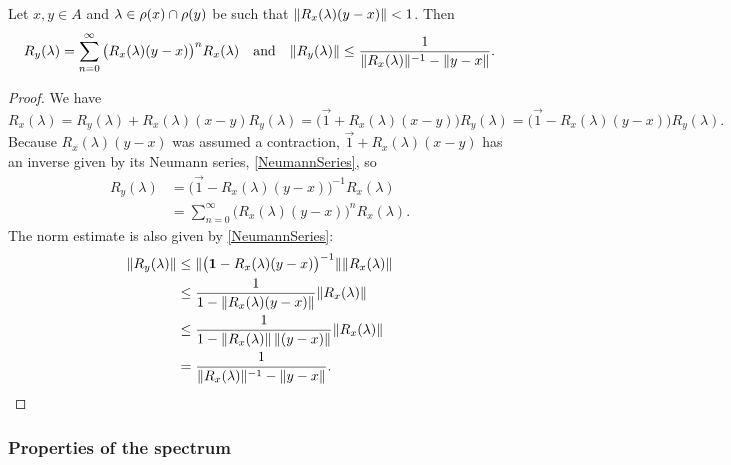 \begin{corollary}
Let $x,y\in A$ and $\lambda\in \rho(x)\cap \rho(y)$ be such that $\lVert R_x(\lambda)(y-x)\rVert<1$. Then 
\[ R_y(\lambda) = \sum_{n=0}^\infty \big(R_x(\lambda)(y-x)\big)^nR_x(\lambda) \quad\text{and}\quad \lVert R_y(\lambda)\rVert \leq \frac{1}{\lVert R_x(\lambda)\rVert^{-1} - \lVert y-x\rVert}. \]
\end{corollary}
\begin{proof}
We have
\[ R_x(\lambda) = R_y(\lambda) + R_x(\lambda)(x-y)R_y(\lambda) = \big(\vec{1} + R_x(\lambda)(x-y)\big)R_y(\lambda) = \big(\vec{1} - R_x(\lambda)(y-x)\big)R_y(\lambda). \]
Because $R_x(\lambda)(y-x)$ was assumed a contraction, $\vec{1} + R_x(\lambda)(x-y)$ has an inverse given by its Neumann series, \ref{NeumannSeries}, so
\begin{align*}
R_y(\lambda) &= \big(\vec{1} - R_x(\lambda)(y-x)\big)^{-1} R_x(\lambda) \\
&= \sum_{n=0}^\infty \big(R_x(\lambda)(y-x)\big)^n R_x(\lambda).
\end{align*}
The norm estimate is also given by \ref{NeumannSeries}:
\begin{align*}
\lVert R_y(\lambda)\rVert &\leq \lVert\big(\boldsymbol{\mathrm{1}} - R_x(\lambda)(y-x)\big)^{-1}\rVert\lVert R_x(\lambda)\rVert \\
&\leq \frac{1}{1 - \lVert R_x(\lambda)(y-x)\rVert}\lVert R_x(\lambda)\rVert \\
&\leq \frac{1}{1 - \lVert R_x(\lambda)\rVert\,\lVert(y-x)\rVert}\lVert R_x(\lambda)\rVert \\
&= \frac{1}{\lVert R_x(\lambda)\rVert^{-1} - \lVert y-x\rVert}.
\end{align*}
\end{proof}

\subsubsection{Properties of the spectrum}

